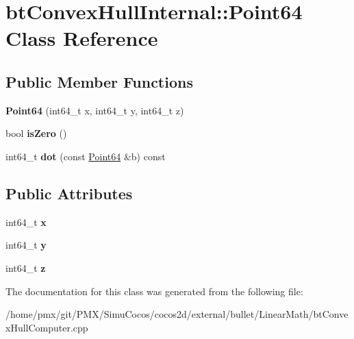 \hypertarget{classbtConvexHullInternal_1_1Point64}{}\section{bt\+Convex\+Hull\+Internal\+:\+:Point64 Class Reference}
\label{classbtConvexHullInternal_1_1Point64}
\subsection*{Public Member Functions}
\begin{DoxyCompactItemize}
\item 
\mbox{\label{classbtConvexHullInternal_1_1Point64_a723b59b7a54fdb1e711ccb73677f6c4e}} 
{\bfseries Point64} (int64\+\_\+t x, int64\+\_\+t y, int64\+\_\+t z)
\item 
\mbox{\label{classbtConvexHullInternal_1_1Point64_a46c5f91fa82aae6e2c4799ac75b08a8e}} 
bool {\bfseries is\+Zero} ()
\item 
\mbox{\label{classbtConvexHullInternal_1_1Point64_aeec0a4ce9d4770f81e51ca1b4cee1e60}} 
int64\+\_\+t {\bfseries dot} (const \hyperlink{classbtConvexHullInternal_1_1Point64}{Point64} \&b) const
\end{DoxyCompactItemize}
\subsection*{Public Attributes}
\begin{DoxyCompactItemize}
\item 
\mbox{\label{classbtConvexHullInternal_1_1Point64_a58f0e47b63cd596d9b2d858245325650}} 
int64\+\_\+t {\bfseries x}
\item 
\mbox{\label{classbtConvexHullInternal_1_1Point64_a3a3d2019def0c35d106f59b05c80d2ed}} 
int64\+\_\+t {\bfseries y}
\item 
\mbox{\label{classbtConvexHullInternal_1_1Point64_ad320c02bed91fcf3d239f3cbcbfb0961}} 
int64\+\_\+t {\bfseries z}
\end{DoxyCompactItemize}


The documentation for this class was generated from the following file\+:\begin{DoxyCompactItemize}
\item 
/home/pmx/git/\+P\+M\+X/\+Simu\+Cocos/cocos2d/external/bullet/\+Linear\+Math/bt\+Convex\+Hull\+Computer.\+cpp\end{DoxyCompactItemize}
